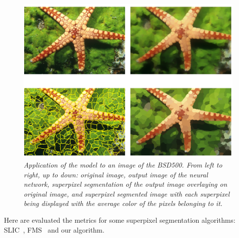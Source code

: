\documentclass{article}
\begin{document}
        \begin{figure}[!htb]
            \centering
            \includegraphics[width=.8\linewidth]{pics/img_bsd_res2.png}
            \caption{\textit{Application of the model to an image of the BSD500. From left to right, up to down: original image, output image of the neural network, superpixel segmentation of the output image overlaying on original image, and superpixel segmented image with each superpixel being displayed with the average color of the pixels belonging to it.}}
        \end{figure}
        \par
        Here are evaluated the metrics for some superpixel segmentation algorithms: SLIC~\cite{achanta2012}, FMS~\cite{figliuzzi2019} and our algorithm.
        \par
\end{document}
